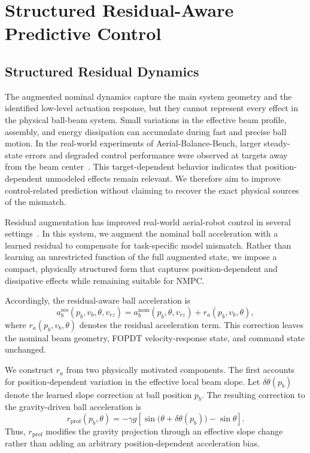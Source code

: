 \documentclass[letterpaper, 10 pt, conference]{ieeeconf}  %
\begin{document}
\section{Structured Residual-Aware Predictive Control}
\label{sec:residual_aware_control}
\subsection{Structured Residual Dynamics}
The augmented nominal dynamics capture the main system geometry and the identified low-level actuation response,
but they cannot represent every effect in the physical ball-beam system. Small variations in the effective beam
profile, assembly, and energy dissipation can accumulate during fast and precise ball motion. In the real-world
experiments of Aerial-Balance-Bench, larger steady-state errors and degraded control performance were observed at
targets away from the beam center~\cite{liu2026aerialBalanceBench}. This target-dependent behavior indicates that
position-dependent unmodeled effects remain relevant. We therefore aim to improve control-related prediction
without claiming to recover the exact physical sources of the mismatch.

Residual augmentation has improved real-world aerial-robot control in several
settings~\cite{shi2019neural,torrente2021data,salzmann2023real}. In this system, we augment the nominal ball
acceleration with a learned residual to compensate for task-specific model mismatch. Rather than
learning an unrestricted function of the full augmented state, we impose a compact, physically structured form
that captures position-dependent and dissipative effects while remaining suitable for NMPC.

Accordingly, the residual-aware ball acceleration is
\begin{equation}
    a_b^{\mathrm{res}}(p_b,v_b,\theta,v_{rz})=a_b^{\mathrm{nom}}(p_b,\theta,v_{rz})+r_a(p_b,v_b,\theta),
    \label{eq:structured_residual_dynamics}
\end{equation}
where $r_a(p_b,v_b,\theta)$ denotes the residual acceleration term. This correction leaves the nominal beam
geometry, FOPDT velocity-response state, and command state unchanged.

We construct $r_a$ from two physically motivated components. The first accounts for position-dependent variation
in the effective local beam slope. Let $\delta\theta(p_b)$ denote the learned slope correction at ball position
$p_b$. The resulting correction to the gravity-driven ball acceleration is
\begin{equation}
    r_{\mathrm{prof}}(p_b,\theta)
    =-\gamma g\!\left[
    \sin\!\bigl(\theta+\delta\theta(p_b)\bigr)-\sin\theta\right].
    \label{eq:profile_residual}
\end{equation}
Thus, $r_{\mathrm{prof}}$ modifies the gravity projection through an effective slope change rather than adding an
arbitrary position-dependent acceleration bias.
\end{document}
